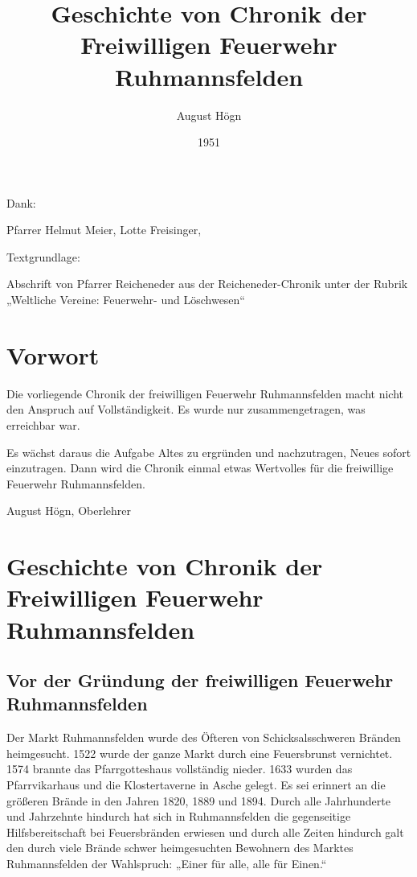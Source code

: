 \documentclass[12pt,a4paper]{book}
\author{August Högn}
\title{Geschichte von Chronik der Freiwilligen Feuerwehr Ruhmannsfelden}
\date{1951}
\begin{document}
\maketitle

\begin{ersteseite}
Dank:

\bigskip

Pfarrer Helmut Meier, Lotte Freisinger,

\bigskip

Textgrundlage:

\bigskip

Abschrift von Pfarrer Reicheneder aus der Reicheneder-Chronik unter der
Rubrik „Weltliche Vereine: Feuerwehr- und Löschwesen“
\end{ersteseite}

\tableofcontents

\part{Vorwort}

Die vorliegende Chronik der freiwilligen Feuerwehr Ruhmannsfelden macht nicht
den Anspruch auf Vollständigkeit. Es wurde nur zusammengetragen, was erreichbar
war.

Es wächst daraus die Aufgabe Altes zu ergründen und nachzutragen, Neues sofort
einzutragen. Dann wird die Chronik einmal etwas Wertvolles für die freiwillige
Feuerwehr Ruhmannsfelden.

August Högn, Oberlehrer

\part[Geschichte von Chronik der Feuerwehr]{Geschichte von Chronik der
Freiwilligen Feuerwehr Ruhmannsfelden}

\chapter{Vor der Gründung der freiwilligen Feuerwehr Ruhmannsfelden}

Der Markt Ruhmannsfelden wurde des Öfteren von Schicksalsschweren Bränden
heimgesucht. 1522 wurde der ganze Markt durch eine Feuersbrunst vernichtet. 1574
brannte das Pfarrgotteshaus vollständig nieder. 1633 wurden das Pfarrvikarhaus
und die Klostertaverne in Asche gelegt. Es sei erinnert an die größeren Brände
in den Jahren 1820, 1889 und 1894. Durch alle Jahrhunderte und Jahrzehnte
hindurch hat sich in Ruhmannsfelden die gegenseitige Hilfsbereitschaft bei
Feuersbränden erwiesen und durch alle Zeiten hindurch galt den durch viele
Brände schwer heimgesuchten Bewohnern des Marktes Ruhmannsfelden der Wahlspruch:
„Einer für alle, alle für Einen.“
\end{document}
